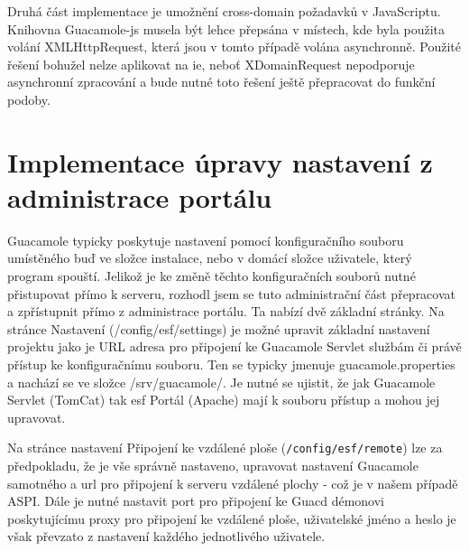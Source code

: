 Druhá část implementace je umožnění cross-domain požadavků v JavaScriptu. Knihovna Guacamole-js musela být lehce přepsána v místech, kde byla použita volání XMLHttpRequest, která jsou v tomto případě volána asynchronně. Použité řešení bohužel nelze aplikovat na \gls{ie}, neboť XDomainRequest nepodporuje asynchronní zpracování a bude nutné toto řešení ještě přepracovat do funkční podoby.

\section{Implementace úpravy nastavení z administrace portálu}
Guacamole typicky poskytuje nastavení pomocí konfiguračního souboru umístěného buď ve složce instalace, nebo v domácí složce uživatele, který program spouští. Jelikož je ke změně těchto konfiguračních souborů nutné přistupovat přímo k serveru, rozhodl jsem se tuto administrační část přepracovat a zpřístupnit přímo z administrace portálu. Ta nabízí dvě základní stránky. Na stránce Nastavení (/config/esf/settings) je možné upravit základní nastavení projektu jako je URL adresa pro připojení ke Guacamole Servlet službám či právě přístup ke konfiguračnímu souboru. Ten se typicky jmenuje guacamole.properties a nachází se ve složce /srv/guacamole/. Je nutné se ujistit, že jak Guacamole Servlet (TomCat) tak \gls{esf} Portál (Apache) mají k souboru přístup a mohou jej upravovat.

Na stránce nastavení Připojení ke vzdálené ploše (\texttt{/config/esf/remote}) lze za předpokladu, že je vše správně nastaveno, upravovat nastavení Guacamole samotného a url pro připojení k serveru vzdálené plochy - což je v našem případě ASPI. Dále je nutné nastavit port pro připojení ke Guacd démonovi poskytujícímu proxy pro připojení ke vzdálené ploše, uživatelské jméno a heslo je však převzato z nastavení každého jednotlivého uživatele.
